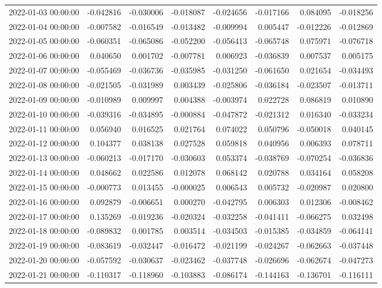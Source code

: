\begin{tabular}{lrrrrrrr}
2022-01-03 00:00:00 & -0.042816 & -0.030006 & -0.018087 & -0.024656 & -0.017166 & 0.084095 & -0.018256 \\
2022-01-04 00:00:00 & -0.007582 & -0.016549 & -0.013482 & -0.009994 & 0.005447 & -0.012226 & -0.012869 \\
2022-01-05 00:00:00 & -0.060351 & -0.065086 & -0.052200 & -0.056413 & -0.065748 & 0.075971 & -0.076718 \\
2022-01-06 00:00:00 & 0.040650 & 0.001702 & -0.007781 & 0.006923 & -0.036839 & 0.007537 & 0.005175 \\
2022-01-07 00:00:00 & -0.055469 & -0.036736 & -0.035985 & -0.031250 & -0.061650 & 0.021654 & -0.034493 \\
2022-01-08 00:00:00 & -0.021505 & -0.031989 & 0.003439 & -0.025806 & -0.036184 & -0.023507 & -0.013711 \\
2022-01-09 00:00:00 & -0.010989 & 0.009997 & 0.004388 & -0.003974 & 0.022728 & 0.086819 & 0.010890 \\
2022-01-10 00:00:00 & -0.039316 & -0.034895 & -0.000884 & -0.047872 & -0.021312 & 0.016340 & -0.033234 \\
2022-01-11 00:00:00 & 0.056940 & 0.016525 & 0.021764 & 0.074022 & 0.050796 & -0.050018 & 0.040145 \\
2022-01-12 00:00:00 & 0.104377 & 0.038138 & 0.027528 & 0.059818 & 0.040956 & 0.006393 & 0.078711 \\
2022-01-13 00:00:00 & -0.060213 & -0.017170 & -0.030603 & 0.053374 & -0.038769 & -0.070254 & -0.036836 \\
2022-01-14 00:00:00 & 0.048662 & 0.022586 & 0.012078 & 0.068142 & 0.020788 & 0.034164 & 0.058208 \\
2022-01-15 00:00:00 & -0.000773 & 0.013455 & -0.000025 & 0.006543 & 0.005732 & -0.020987 & 0.020800 \\
2022-01-16 00:00:00 & 0.092879 & -0.006651 & 0.000270 & -0.042795 & 0.006303 & 0.012306 & -0.008462 \\
2022-01-17 00:00:00 & 0.135269 & -0.019236 & -0.020324 & -0.032258 & -0.041411 & -0.066275 & 0.032498 \\
2022-01-18 00:00:00 & -0.089832 & 0.001785 & 0.003514 & -0.034503 & -0.015385 & -0.034859 & -0.064141 \\
2022-01-19 00:00:00 & -0.083619 & -0.032447 & -0.016472 & -0.021199 & -0.024267 & -0.062663 & -0.037448 \\
2022-01-20 00:00:00 & -0.057592 & -0.030637 & -0.023462 & -0.037748 & -0.026696 & -0.062674 & -0.047273 \\
2022-01-21 00:00:00 & -0.110317 & -0.118960 & -0.103883 & -0.086174 & -0.144163 & -0.136701 & -0.116111 \\

\end{tabular}
